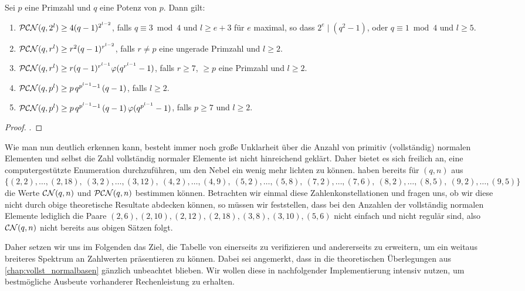 \begin{satz}
  Sei $p$ eine Primzahl und $q$ eine Potenz von $p$. Dann gilt:
  \begin{enumerate}
    \item $\mathcal{PCN}(q,2^l) \geq 4(q-1)^{2^{l-2}}$, falls $q\equiv 3 \bmod 4$
      und $l\geq e+3$ für $e$ maximal, so dass $2^e\mid (q^2-1)$, oder
      $q\equiv 1\bmod 4$ und $l\geq 5$.
    \item $\mathcal{PCN}(q,r^l) \geq r^2(q-1)^{r^{l-2}}$, falls
      $r\neq p$ eine ungerade Primzahl und $l\geq 2$.
    \item $\mathcal{PCN}(q,r^l) \geq r(q-1)^{r^{l-1}}\varphi(q^{r^{l-1}}-1)$, falls
      $r\geq 7$, $\geq p$ eine Primzahl und $l\geq 2$.
    \item $\mathcal{PCN}(q,p^l) \geq p\,q^{p^{l-1}-1}\,(q-1)$, falls $l\geq 2$.
    \item $\mathcal{PCN}(q,p^l)\geq p\,q^{p^{l-1}-1}\,(q-1)\,\varphi(q^{p^{l-1}}-1)$,
      falls $p\geq 7$ und $l\geq 2$.
  \end{enumerate}
\end{satz}
\begin{proof}
  \autocite{hachenberger2010}.
\end{proof}

Wie man nun deutlich erkennen kann, besteht immer noch große Unklarheit über
die Anzahl von primitiv (vollständig) normalen Elementen und selbst die Zahl
vollständig normaler Elemente ist nicht hinreichend geklärt. Daher bietet es
sich freilich an, eine computergestützte Enumeration durchzuführen, um den
Nebel ein wenig mehr lichten zu können. 
\citeauthor{morgan1996} \autocite{morgan1996} haben bereits 
\citeyear{morgan1996} für $(q,n)$ aus 
$\{ (2,2),\ldots,(2,18),\allowbreak\ 
  (3,2),\ldots,(3,12),\allowbreak\ 
  (4,2),\ldots,(4,9),\allowbreak\ 
  (5,2),\ldots,(5,8),\allowbreak\ 
  (7,2),\ldots,(7,6),\allowbreak\ 
  (8,2),\ldots,(8,5),\allowbreak\ 
  (9,2),\ldots,(9,5)\}$ die Werte $\mathcal{CN}(q,n)$ und $\mathcal{PCN}(q,n)$ bestimmen können.
Betrachten wir einmal diese Zahlenkonstellationen und fragen uns, ob wir diese
nicht durch obige theoretische Resultate abdecken können, so müssen wir
feststellen, dass bei den Anzahlen der vollständig normalen Elemente lediglich
die Paare $(2,6), (2,10),(2,12),(2,18), (3,8), (3,10), (5,6)$ nicht einfach und
nicht regulär sind, also $\mathcal{CN}(q,n)$ nicht bereits aus obigen Sätzen
folgt.

Daher setzen wir uns im Folgenden das Ziel, die Tabelle von 
\citeauthor{morgan1996} einerseits zu verifizieren und andererseits zu
erweitern, um ein weitaus breiteres Spektrum an Zahlwerten präsentieren zu
können. Dabei sei angemerkt, dass in \autocite{morgan1996} die theoretischen
Überlegungen aus \autoref{chap:vollst_normalbasen} gänzlich unbeachtet blieben.
Wir wollen diese in nachfolgender Implementierung intensiv nutzen, um
bestmögliche Ausbeute vorhanderer Rechenleistung zu erhalten.
